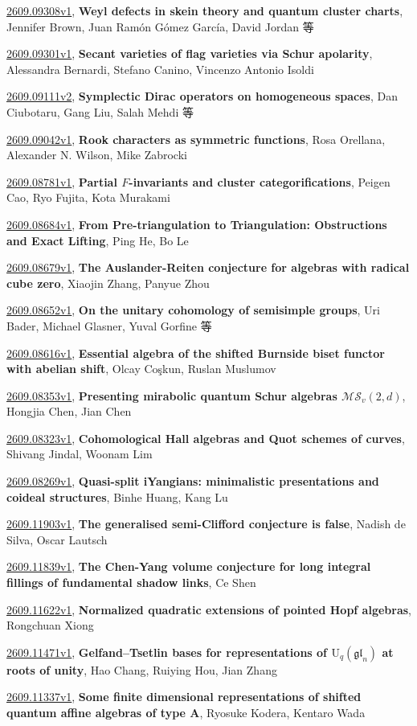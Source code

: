 \documentclass[9pt, a4paper]{article}
\theoremstyle{plain}
\theoremstyle{definition}
\theoremstyle{remark}
\newcommand{\arxiv}[3]{\href{https://arxiv.org/abs/#1}{#1}, \textbf{\textcolor{arxivblue}{#2}}, #3}
\begin{document}
\arxiv{2609.09308v1}{Weyl defects in skein theory and quantum cluster charts}{Jennifer Brown, Juan Ramón Gómez García, David Jordan 等}

\arxiv{2609.09301v1}{Secant varieties of flag varieties via Schur apolarity}{Alessandra Bernardi, Stefano Canino, Vincenzo Antonio Isoldi}

\arxiv{2609.09111v2}{Symplectic Dirac operators on homogeneous spaces}{Dan Ciubotaru, Gang Liu, Salah Mehdi 等}

\arxiv{2609.09042v1}{Rook characters as symmetric functions}{Rosa Orellana, Alexander N. Wilson, Mike Zabrocki}

\arxiv{2609.08781v1}{Partial $F$-invariants and cluster categorifications}{Peigen Cao, Ryo Fujita, Kota Murakami}

\arxiv{2609.08684v1}{From Pre-triangulation to Triangulation: Obstructions and Exact Lifting}{Ping He, Bo Le}

\arxiv{2609.08679v1}{The Auslander-Reiten conjecture for algebras with radical cube zero}{Xiaojin Zhang, Panyue Zhou}

\arxiv{2609.08652v1}{On the unitary cohomology of semisimple groups}{Uri Bader, Michael Glasner, Yuval Gorfine 等}

\arxiv{2609.08616v1}{Essential algebra of the shifted Burnside biset functor with abelian shift}{Olcay Coşkun, Ruslan Muslumov}

\arxiv{2609.08353v1}{Presenting mirabolic quantum Schur algebras $\mathcal{MS}_v(2,d)$}{Hongjia Chen, Jian Chen}

\arxiv{2609.08323v1}{Cohomological Hall algebras and Quot schemes of curves}{Shivang Jindal, Woonam Lim}

\arxiv{2609.08269v1}{Quasi-split iYangians: minimalistic presentations and coideal structures}{Binhe Huang, Kang Lu}

\arxiv{2609.11903v1}{The generalised semi-Clifford conjecture is false}{Nadish de Silva, Oscar Lautsch}

\arxiv{2609.11839v1}{The Chen-Yang volume conjecture for long integral fillings of fundamental shadow links}{Ce Shen}

\arxiv{2609.11622v1}{Normalized quadratic extensions of pointed Hopf algebras}{Rongchuan Xiong}

\arxiv{2609.11471v1}{Gelfand--Tsetlin bases for representations of $\mathrm U_{q}(\mathfrak{gl}_n)$ at roots of unity}{Hao Chang, Ruiying Hou, Jian Zhang}

\arxiv{2609.11337v1}{Some finite dimensional representations of shifted quantum affine algebras of type A}{Ryosuke Kodera, Kentaro Wada}
\end{document}
